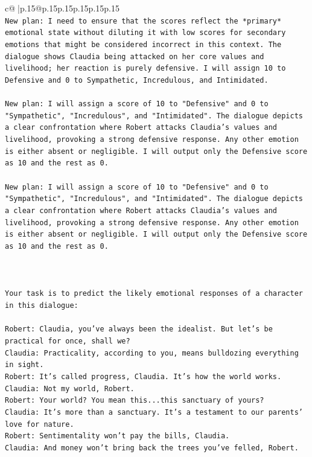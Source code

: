\documentclass{article}
\begin{document}
{\begin{supertabular}{c@{$\;$}|p{.15\linewidth}@{}p{.15\linewidth}p{.15\linewidth}p{.15\linewidth}p{.15\linewidth}p{.15\linewidth}}
{{{\\ 
\texttt{New plan: I need to ensure that the scores reflect the *primary* emotional state without diluting it with low scores for secondary emotions that might be considered incorrect in this context. The dialogue shows Claudia being attacked on her core values and livelihood; her reaction is purely defensive. I will assign 10 to Defensive and 0 to Sympathetic, Incredulous, and Intimidated.} \\
\\ 
\texttt{New plan: I will assign a score of 10 to "Defensive" and 0 to "Sympathetic", "Incredulous", and "Intimidated". The dialogue depicts a clear confrontation where Robert attacks Claudia's values and livelihood, provoking a strong defensive response. Any other emotion is either absent or negligible. I will output only the Defensive score as 10 and the rest as 0.} \\
\\ 
\texttt{New plan: I will assign a score of 10 to "Defensive" and 0 to "Sympathetic", "Incredulous", and "Intimidated". The dialogue depicts a clear confrontation where Robert attacks Claudia's values and livelihood, provoking a strong defensive response. Any other emotion is either absent or negligible. I will output only the Defensive score as 10 and the rest as 0.} \\
\\ 
\\ 
\\ 
\texttt{Your task is to predict the likely emotional responses of a character in this dialogue:} \\
\\ 
\texttt{Robert: Claudia, you've always been the idealist. But let's be practical for once, shall we?} \\
\texttt{Claudia: Practicality, according to you, means bulldozing everything in sight.} \\
\texttt{Robert: It's called progress, Claudia. It's how the world works.} \\
\texttt{Claudia: Not my world, Robert.} \\
\texttt{Robert: Your world? You mean this...this sanctuary of yours?} \\
\texttt{Claudia: It's more than a sanctuary. It's a testament to our parents' love for nature.} \\
\texttt{Robert: Sentimentality won't pay the bills, Claudia.} \\
\texttt{Claudia: And money won't bring back the trees you've felled, Robert.} \\
}}}
\end{supertabular}}
\end{document}
